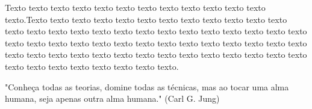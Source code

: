 
\vspace*{10cm}
\begin{citacao}
Texto texto texto texto texto texto texto texto texto texto texto texto texto.Texto texto texto texto texto texto texto texto texto texto texto texto texto texto texto texto texto texto texto texto texto texto texto texto texto texto texto texto texto texto texto texto texto texto texto texto texto texto texto texto texto texto texto texto texto texto texto texto texto texto texto texto texto texto texto texto texto texto texto texto texto texto.

\end{citacao}

    \vspace*{5cm}
	
		"Conheça todas as teorias, domine todas as técnicas, mas ao tocar uma alma humana, seja apenas outra alma humana."
    (Carl G. Jung)
\newpage